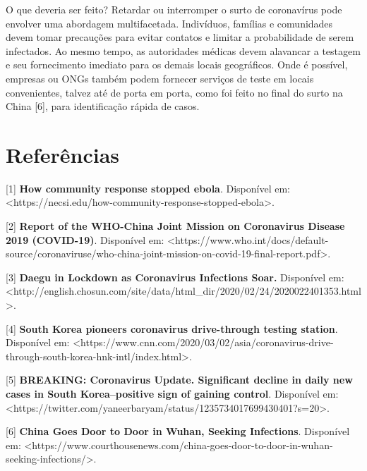 \documentclass[onecolumn,journal]{IEEEtran}
\begin{document}
\begin{multicols}{2}
O que deveria ser feito? Retardar ou interromper o surto de coronavírus pode envolver uma abordagem multifacetada. Indivíduos, famílias e comunidades devem tomar precauções para evitar contatos e limitar a probabilidade de serem infectados. Ao mesmo tempo, as autoridades médicas devem alavancar a testagem e seu fornecimento imediato para os demais locais geográficos. Onde é possível, empresas ou ONGs também podem fornecer serviços de teste em locais convenientes, talvez até de porta em porta, como foi feito no final do surto na China [6], para identificação rápida de casos.

\end{multicols}

\section*{Referências}

[1] \textbf{How community response stopped ebola}. Disponível em: <https://necsi.edu/how-community-response-stopped-ebola>.

[2] \textbf{Report of the WHO-China Joint Mission on Coronavirus Disease 2019 (COVID-19)}. Disponível em: <https://www.who.int/docs/default-source/coronaviruse/who-china-joint-mission-on-covid-19-final-report.pdf>.

[3] \textbf{Daegu in Lockdown as Coronavirus Infections Soar.} Disponível em: <http://english.chosun.com/site/data/html_dir/2020/02/24/2020022401353.html>.

[4] \textbf{South Korea pioneers coronavirus drive-through testing station}. Disponível em: <https://www.cnn.com/2020/03/02/asia/coronavirus-drive-through-south-korea-hnk-intl/index.html>.

[5] \textbf{BREAKING: Coronavirus Update. Significant decline in daily new cases in South Korea–positive sign of gaining control}. Disponível em: <https://twitter.com/yaneerbaryam/status/1235734017699430401?s=20>.

[6] \textbf{China Goes Door to Door in Wuhan, Seeking Infections}. Disponível em: <https://www.courthousenews.com/china-goes-door-to-door-in-wuhan-seeking-infections/>.

% 
\end{document}
